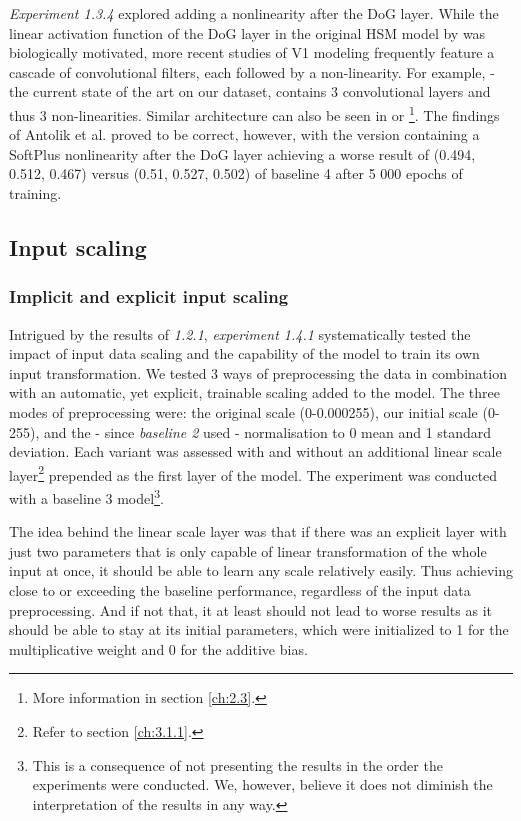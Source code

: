 \textit{Experiment 1.3.4} explored adding a nonlinearity after the DoG layer. While the linear activation function of the DoG layer in the original HSM model by \cite{antolik} was biologically motivated, more recent studies of V1 modeling frequently feature a cascade of convolutional filters, each followed by a non-linearity. For example, \cite{klindt} - the current state of the art on our dataset, contains 3 convolutional layers and thus 3 non-linearities. Similar architecture can also be seen in \cite{ecker} or \cite{Walke506956}\footnote{More information in section \ref{ch:2.3}.}. The findings of Antolik et al. proved to be correct, however, with the version containing a SoftPlus nonlinearity after the DoG layer achieving a worse result of (0.494, 0.512, 0.467) versus (0.51, 0.527, 0.502) of baseline 4 after 5 000 epochs of training.

\subsection{Input scaling}
\subsubsection{Implicit and explicit input scaling}

Intrigued by the results of \textit{1.2.1}, \textit{experiment 1.4.1} systematically tested the impact of input data scaling and the capability of the model to train its own input transformation. We tested 3 ways of preprocessing the data in combination with an automatic, yet explicit, trainable scaling added to the model. The three modes of preprocessing were: the original scale (0-0.000255), our initial scale (0-255), and the - since \textit{baseline 2} used - normalisation to 0 mean and 1 standard deviation. Each variant was assessed with and without an additional linear scale layer\footnote{Refer to section \ref{ch:3.1.1}.} prepended as the first layer of the model. The experiment was conducted with a baseline 3 model\footnote{This is a consequence of not presenting the results in the order the experiments were conducted. We, however, believe it does not diminish the interpretation of the results in any way.}.

The idea behind the linear scale layer was that if there was an explicit layer with just two parameters that is only capable of linear transformation of the whole input at once, it should be able to learn any scale relatively easily. Thus achieving close to or exceeding the baseline performance, regardless of the input data preprocessing. And if not that, it at least should not lead to worse results as it should be able to stay at its initial parameters, which were initialized to 1 for the multiplicative weight and 0 for the additive bias.

